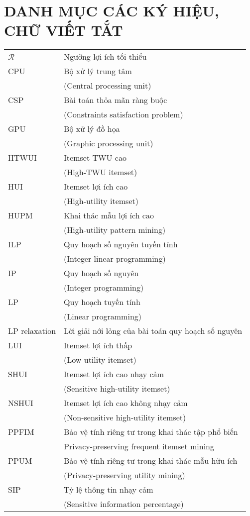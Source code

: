 \chapter*{DANH MỤC CÁC KÝ HIỆU, CHỮ VIẾT TẮT}
\begin{center}
	\begin{longtable}{ l  l }
		$\mathcal{R}$ &Ngưỡng lợi ích tối thiểu \\
		CPU& Bộ xử lý trung tâm\\
		&(Central processing unit)\\
		CSP& Bài toán thỏa mãn ràng buộc\\
		&(Constraints satisfaction problem)\\
		GPU& Bộ xử lý đồ họa\\
		&(Graphic processing unit)\\
		HTWUI& Itemset TWU cao\\
		&(High-TWU itemset)\\
		HUI & Itemset lợi ích cao\\
		&(High-utility itemset)\\
		HUPM & Khai thác mẫu lợi ích cao\\
		&(High-utility pattern mining)\\
		ILP & Quy hoạch số nguyên tuyến tính\\
		& (Integer linear programming)\\
		IP & Quy hoạch số nguyên\\
		&(Integer programming)\\
		LP& Quy hoạch tuyến tính\\
		&(Linear programming)\\
		LP relaxation& Lời giải nới lỏng của bài toán quy hoạch số nguyên\\
		LUI&Itemset lợi ích thấp\\
		&(Low-utility itemset)\\
		SHUI & Itemset lợi ích cao nhạy cảm\\
		&(Sensitive high-utility itemset)\\
		NSHUI &Itemset lợi ích cao không nhạy cảm \\
		&(Non-sensitive high-utility itemset)\\
		PPFIM& Bảo vệ tính riêng tư trong khai thác tập phổ biến\\
		& Privacy-preserving frequent itemset mining\\
		PPUM& Bảo vệ tính riêng tư trong khai thác mẫu hữu ích\\
		&(Privacy-preserving utility mining)\\
		SIP& Tỷ lệ thông tin nhạy cảm\\
		&(Sensitive information percentage)\\
\end{longtable}

\end{center}